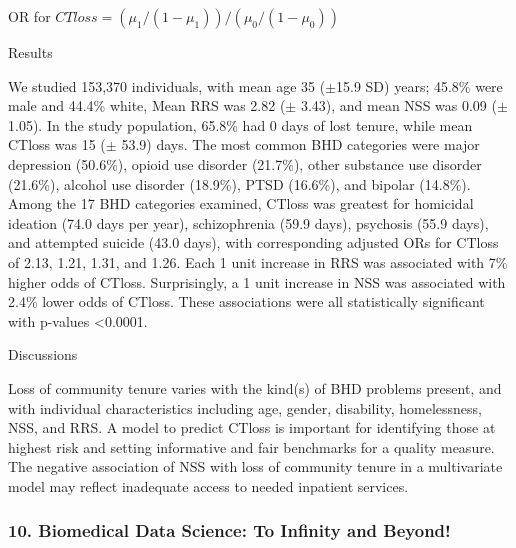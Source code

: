 \begin{itemize}
OR for $CTloss=(\mu_1/(1-\mu_1 ))/(\mu_0/(1-\mu_0 ))$

Results

We studied 153,370 individuals, with mean age 35 ($\pm$15.9 SD) years; 45.8\% were male and 44.4\% white, Mean RRS was 2.82 ($\pm$ 3.43), and mean NSS was 0.09 ($\pm$ 1.05). In the study population, 65.8\% had 0 days of lost tenure, while mean CTloss was 15 ($\pm$ 53.9) days. The most common BHD categories were major depression (50.6\%), opioid use disorder (21.7\%), other substance use disorder (21.6\%), alcohol use disorder (18.9\%), PTSD (16.6\%), and bipolar (14.8\%). Among the 17 BHD categories examined, CTloss was greatest for homicidal ideation (74.0 days per year), schizophrenia (59.9 days), psychosis (55.9 days), and attempted suicide (43.0 days), with corresponding adjusted ORs for CTloss of 2.13, 1.21, 1.31, and 1.26. Each 1 unit increase in RRS was associated with 7\% higher odds of CTloss. Surprisingly, a 1 unit increase in NSS was associated with 2.4\% lower odds of CTloss. These associations were all statistically significant with p-values <0.0001.

Discussions

Loss of community tenure varies with the kind(s) of BHD problems present, and with individual characteristics including age, gender, disability, homelessness, NSS, and RRS. A model to predict CTloss is important for identifying those at highest risk and setting informative and fair benchmarks for a quality measure. The negative association of NSS with loss of community tenure in a multivariate model may reflect inadequate access to needed inpatient services.  


\end{itemize}

\subsubsection*{10. Biomedical Data Science: To Infinity and Beyond!}

